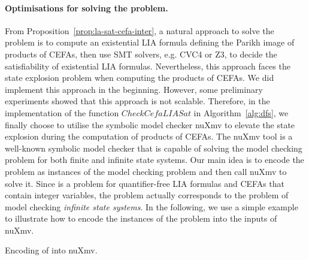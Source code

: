 \paragraph*{Optimisations for solving the {\lasat} problem.} From Proposition~\ref{prop:la-sat-cefa-inter}, a natural approach to solve the {\lasat} problem is to compute an existential LIA formula defining the Parikh image of products of CEFAs, then use SMT solvers, e.g. CVC4 or Z3, to decide the satisfiability of existential LIA formulas. Nevertheless, this approach faces the state explosion problem when computing the products of CEFAs.  We did implement this approach in the beginning. However, some preliminary experiments showed that this approach is not scalable. Therefore, in the implementation of the function $\mathit{CheckCefaLIASat}$ in Algorithm~\ref{alg:dfs},  we finally choose to utilise the symbolic model checker nuXmv \cite{nuxmv} to elevate the state explosion during the computation of products of CEFAs. The nuXmv tool is a well-known symbolic model checker that is capable of solving the model checking problem for both finite and infinite state systems. Our main idea is to encode the {\lasat} problem as instances of the model checking problem and then call nuXmv to solve it. Since  {\lasat} is a problem for quantifier-free LIA formulas and CEFAs that contain integer variables, the {\lasat} problem actually corresponds to the problem of model checking \emph{infinite state systems}. In the following, we use a simple example to illustrate how to encode the instances of  the {\lasat} problem into the inputs of nuXmv.

\begin{example}
Encoding of {\lasat} into nuXmv.
\end{example}


